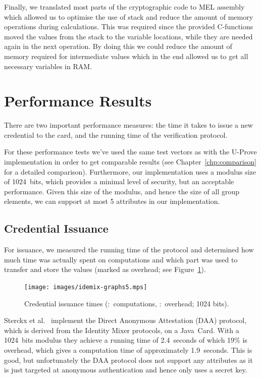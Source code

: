 Finally, we translated most parts of the cryptographic code to MEL assembly
which allowed us to optimise the use of stack and reduce the amount of memory
operations during calculations. This was required since the provided C-functions
moved the values from the stack to the variable locations, while they are needed
again in the next operation. By doing this we could reduce the amount of memory
required for intermediate values which in the end allowed us to get all
necessary variables in RAM.

\section{Performance Results}

There are two important performance measures: the time it takes to issue a new
credential to the card, and the running time of the verification protocol.

For these performance tests we've used the same test vectors as with the U-Prove
implementation in order to get comparable results (see
Chapter~\ref{chp:comparison} for a detailed comparison). Furthermore, our
implementation uses a modulus size of 1024~bits, which provides a minimal level
of security, but an acceptable performance. Given this size of the modulus, and
hence the size of all group elements, we can support at most 5 attributes in our
implementation.

\subsection{Credential Issuance}

For issuance, we measured the running time of the protocol and determined how
much time was actually spent on computations and which part was used to transfer
and store the values (marked as overhead; see Figure~\ref{fig:issuance}).

\begin{figure}[b]
  \centering
  \texttt{[image: images/idemix-graphs5.mps]}

  \caption[Credential issuance times.]{
    Credential issuance times
    (:~computations,
      :~overhead; 1024 bits).}
  \label{fig:issuance}
\end{figure}

Sterckx et al.~\cite{Sterckx09} implement the Direct Anonymous Attestation (DAA)
protocol, which is derived from the Identity Mixer protocols, on a Java~Card.
With a 1024~bits modulus they achieve a running time of 2.4~seconds of which
19\% is overhead, which gives a computation time of approximately 1.9~seconds.
This is good, but unfortunately the DAA protocol does not support any attributes
as it is just targeted at anonymous authentication and hence only uses a secret
key.

